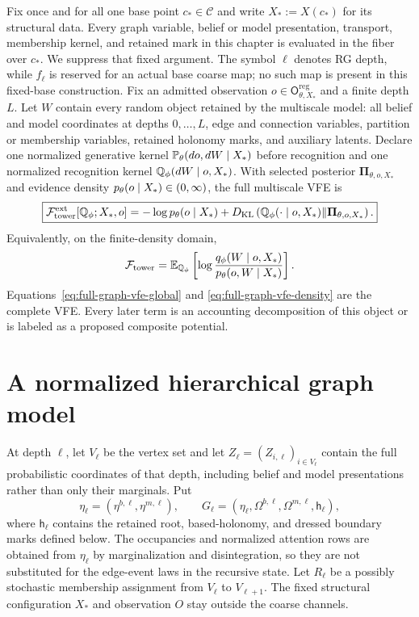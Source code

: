 Fix once and for all one base point $c_*\in\mathcal C$ and write
$X_*:=X(c_*)$ for its structural data. Every graph variable, belief or model
presentation, transport, membership kernel, and retained mark in this chapter
is evaluated in the fiber over $c_*$. We suppress that fixed argument. The
symbol $\ell$ denotes RG depth, while $f_\ell$ is reserved for an actual base
coarse map; no such map is present in this fixed-base construction. Fix an
admitted observation $o\in\mathsf O_{\theta,X_*}^{\mathrm{reg}}$ and a finite
depth $L$. Let $W$ contain every random object retained by the multiscale
model: all belief and model coordinates at depths $0,\ldots,L$, edge and
connection variables, partition or membership variables, retained holonomy
marks, and auxiliary latents. Declare one normalized generative kernel
$\mathbb P_\theta(do,dW\mid X_*)$ before recognition and one normalized
recognition kernel $\mathbb Q_\phi(dW\mid o,X_*)$. With selected posterior
$\boldsymbol\Pi_{\theta,o,X_*}$ and evidence density
$p_\theta(o\mid X_*)\in(0,\infty)$, the full multiscale VFE is
\begin{equation}
\boxed{
\mathcal F_{\mathrm{tower}}^{\mathrm{ext}}
[\mathbb Q_\phi;X_*,o]
=-\log p_\theta(o\mid X_*)
+D_{\mathrm{KL}}\left(
\mathbb Q_\phi(\cdot\mid o,X_*)
\middle\Vert
\boldsymbol\Pi_{\theta,o,X_*}
\right).}
\label{eq:full-graph-vfe-global}
\end{equation}
Equivalently, on the finite-density domain,
\begin{equation}
\mathcal F_{\mathrm{tower}}
=\mathbb E_{\mathbb Q_\phi}
\left[
\log\frac{q_\phi(W\mid o,X_*)}{p_\theta(o,W\mid X_*)}
\right].
\label{eq:full-graph-vfe-density}
\end{equation}
Equations~\eqref{eq:full-graph-vfe-global} and
\eqref{eq:full-graph-vfe-density} are the complete VFE. Every later term is an
accounting decomposition of this object or is labeled as a proposed composite
potential. 

\section{A normalized hierarchical graph model}
\label{sec:full-graph-vfe-joint}

At depth $\ell$, let $V_\ell$ be the vertex set and let
$Z_\ell=(Z_{i,\ell})_{i\in V_\ell}$ contain the full probabilistic coordinates
of that depth, including belief and model presentations rather than only their
marginals. Put
\begin{equation}
\eta_\ell=(\eta^{b,\ell},\eta^{m,\ell}),
\qquad
G_\ell=(\eta_\ell,\Omega^{b,\ell},\Omega^{m,\ell},\mathsf h_\ell),
\label{eq:full-graph-closed-scale-datum}
\end{equation}
where $\mathsf h_\ell$ contains the retained root, based-holonomy, and dressed
boundary marks defined below. The occupancies and normalized attention rows
are obtained from $\eta_\ell$ by marginalization and disintegration, so they
are not substituted for the edge-event laws in the recursive state. Let
$R_\ell$ be a possibly stochastic membership assignment from $V_\ell$ to
$V_{\ell+1}$. The fixed structural configuration $X_*$ and observation $O$
stay outside the coarse channels.

